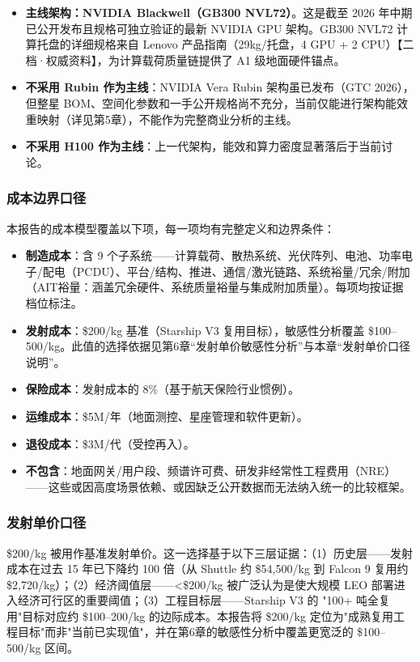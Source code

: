 \begin{itemize}[leftmargin=*]
    \item \textbf{主线架构：NVIDIA Blackwell（GB300 NVL72）}。这是截至 2026 年中期已公开发布且规格可独立验证的最新 NVIDIA GPU 架构。GB300 NVL72 计算托盘的详细规格来自 Lenovo 产品指南（29\;kg/托盘，4 GPU + 2 CPU）【二档·权威资料】\cite{lenovo2025gb300}，为计算载荷质量链提供了 A1 级地面硬件锚点。
    \item \textbf{不采用 Rubin 作为主线}：NVIDIA Vera Rubin 架构虽已发布（GTC 2026），但整星 BOM、空间化参数和一手公开规格尚不充分，当前仅能进行架构能效重映射（详见第5章），不能作为完整商业分析的主线。
    \item \textbf{不采用 H100 作为主线}：上一代架构，能效和算力密度显著落后于当前讨论。
\end{itemize}

\subsubsection{成本边界口径}

本报告的成本模型覆盖以下项，每一项均有完整定义和边界条件：

\begin{itemize}[leftmargin=*]
    \item \textbf{制造成本}：含 9 个子系统——计算载荷、散热系统、光伏阵列、电池、功率电子/配电（PCDU）、平台/结构、推进、通信/激光链路、系统裕量/冗余/附加（AIT裕量：涵盖冗余硬件、系统质量裕量与集成附加质量）。每项均按证据档位标注。
    \item \textbf{发射成本}：\$200/kg 基准（Starship V3 复用目标），敏感性分析覆盖 \$100--500/kg。此值的选择依据见第6章“发射单价敏感性分析”与本章“发射单价口径说明”。
    \item \textbf{保险成本}：发射成本的 8\%（基于航天保险行业惯例）。
    \item \textbf{运维成本}：\$5M/年（地面测控、星座管理和软件更新）。
    \item \textbf{退役成本}：\$3M/代（受控再入）。
    \item \textbf{不包含}：地面网关/用户段、频谱许可费、研发非经常性工程费用（NRE）——这些或因高度场景依赖、或因缺乏公开数据而无法纳入统一的比较框架。
\end{itemize}

\subsubsection{发射单价口径}

\$200/kg 被用作基准发射单价。这一选择基于以下三层证据：（1）历史层——发射成本在过去 15 年已下降约 100 倍（从 Shuttle 约 \$54,500/kg 到 Falcon 9 复用约 \$2,720/kg）\cite{nasalaunch2018}；（2）经济阈值层——\textless\$200/kg 被广泛认为是使大规模 LEO 部署进入经济可行区的重要阈值；（3）工程目标层——Starship V3 的 "100+ 吨全复用"目标对应约 \$100--200/kg 的边际成本{}\cite{33fg2026starship}。本报告将 \$200/kg 定位为"成熟复用工程目标"而非"当前已实现值"，并在第6章的敏感性分析中覆盖更宽泛的 \$100--500/kg 区间。

